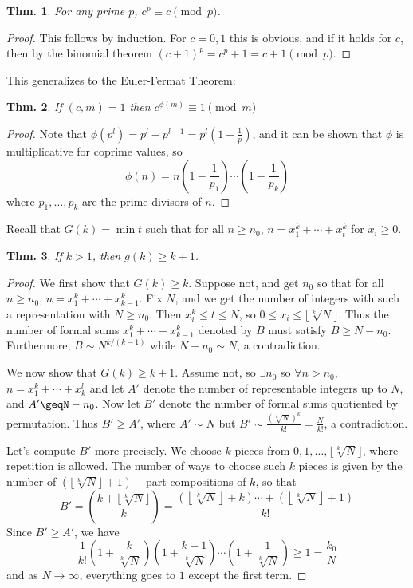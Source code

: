 \documentclass[12pt, a4paper]{book}
\newtheorem{theorem}{Thm.}[section]
\theoremstyle{nonumberplain}
\newtheorem{proof}{Proof}
\begin{document}
\begin{theorem}
    For any prime $p$, $c^p\equiv c\pmod{p}$.
\end{theorem}
\begin{proof}
    This follows by induction.
    For $c=0,1$ this is obvious, and if it holds for $c$, then by the binomial theorem $(c+1)^p=c^p+1=c+1\pmod{p}$.
\end{proof}
This generalizes to the Euler-Fermat Theorem:
\begin{theorem}
    If $(c,m)=1$ then $c^{\phi(m)}\equiv 1\pmod{m}$
\end{theorem}
\begin{proof}
    Note that $\phi(p^l)=p^l-p^{l-1}=p^l\left(1-\frac{1}{p}\right)$, and it can be shown that $\phi$ is multiplicative for coprime values, so
    \[\phi(n)=n\left(1-\frac{1}{p_1}\right)\cdots\left(1-\frac{1}{p_k}\right)\]
    where $p_1,\ldots,p_k$ are the prime divisors of $n$.
\end{proof}
Recall that $G(k)=\min t$ such that for all $n\geq n_0$, $n=x_1^k+\cdots+x_t^k$ for $x_i\geq 0$.
\begin{theorem}
    If $k>1$, then $g(k)\geq k+1$.
\end{theorem}
\begin{proof}
    We first show that $G(k)\geq k$.
    Suppose not, and get $n_0$ so that for all$ n\geq n_0$, $n=x_1^k+\cdots+x_{k-1}^k$.
    Fix $N$, and we get the number of integers with such a representation with $N\geq n_0$.
    Then $x_i^k\leq t\leq N$, so $0\leq x_i\leq\lfloor\sqrt[k]{N}\rfloor$.
    Thus the number of formal sums $x_1^k+\cdots+x_{k-1}^k$ denoted by $B$ must satisfy $B\geq N-n_0$.
    Furthermore, $B\sim N^{k/(k-1)}$ while $N-n_0\sim N$, a contradiction.

    We now show that $G(k)\geq k+1$.
    Assume not, so $\exists n_0$ so $\forall n>n_0$, $n=x_1^k+\cdots+x_k^l$ and let $A'$ denote the number of representable integers up to $N$, and $A'\geqN-n_0$.
    Now let $B'$ denote the number of formal sums quotiented by permutation.
    Thus $B'\geq A'$, where $A'\sim N$ but $B'\sim \frac{(\sqrt[k]{N})^k}{k!}=\frac{N}{k!}$, a contradiction.

    Let's compute $B'$ more precisely.
    We choose $k$ pieces from $0,1,\ldots,\lfloor\sqrt[k]{N}\rfloor$, where repetition is allowed.
    The number of ways to choose such $k$ pieces is given by the number of $(\lfloor\sqrt[k]{N}\rfloor+1)-$part compositions of $k$, so that
    \[B'=\binom{k+\lfloor\sqrt[k]{N}\rfloor}{k}=\frac{(\left\lfloor\sqrt[k]{N}\right\rfloor+k)\cdots+(\left\lfloor\sqrt[k]{N}\right\rfloor+1)}{k!}\]
    Since $B'\geq A'$, we have
    \[\frac{1}{k!}\left(1+\frac{k}{\sqrt[k]{N}}\right)\left(1+\frac{k-1}{\sqrt[k]{N}}\right)\cdots\left(1+\frac{1}{\sqrt[k]{N}}\right)\geq1=\frac{k_0}{N}\]
    and as $N\to\infty$, everything goes to $1$ except the first term.
\end{proof}
\end{document}
